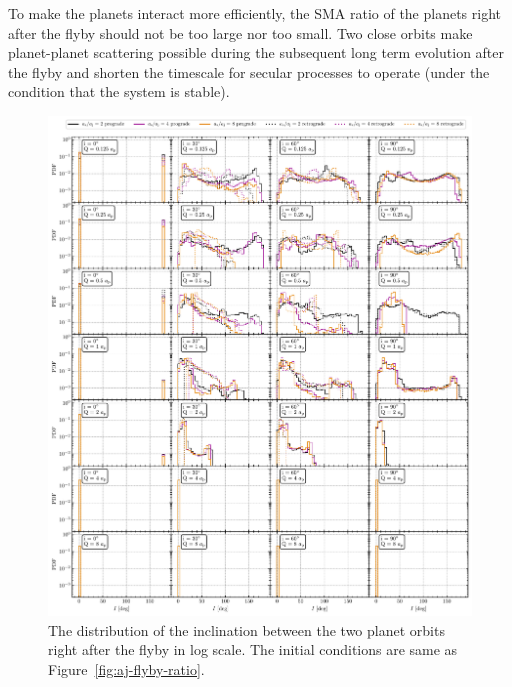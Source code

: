 \documentclass[twocolumn]{aastex63}
\newcommand*\fgr[1]{Figure~\ref{#1}}
\begin{document}
To make the planets interact more efficiently, the SMA ratio of the planets right after the flyby should not be too large nor too small. Two close orbits make planet-planet scattering possible during the subsequent long term evolution after the flyby and shorten the timescale for secular processes to operate (under the condition that the system is stable).

\begin{figure}
    \includegraphics[width=\textwidth]{figs/inc-flyby-ratio.pdf}
    \caption{The distribution of the inclination between the two planet orbits right after the flyby in log scale. The initial conditions are same as \fgr{fig:aj-flyby-ratio}.} 
    \label{fig:inc-flyby-ratio}
\end{figure}
\end{document}
